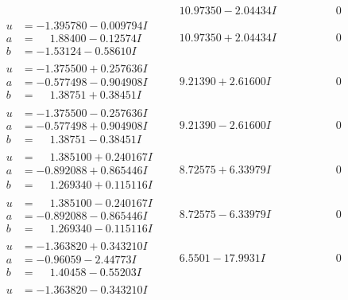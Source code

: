 \documentclass[1p]{elsarticle_modified}
\theoremstyle{definition}
\begin{document}
$$\begin{array}{c|c|c}
 & \phantom{-}10.97350 - 2.04434 I & \phantom{-0.000000 } 0 \\ \hline\begin{aligned}
u &= -1.395780 - 0.009794 I \\
a &= \phantom{-}1.88400 - 0.12574 I \\
b &= -1.53124 - 0.58610 I\end{aligned}
 & \phantom{-}10.97350 + 2.04434 I & \phantom{-0.000000 } 0 \\ \hline\begin{aligned}
u &= -1.375500 + 0.257636 I \\
a &= -0.577498 - 0.904908 I \\
b &= \phantom{-}1.38751 + 0.38451 I\end{aligned}
 & \phantom{-}9.21390 + 2.61600 I & \phantom{-0.000000 } 0 \\ \hline\begin{aligned}
u &= -1.375500 - 0.257636 I \\
a &= -0.577498 + 0.904908 I \\
b &= \phantom{-}1.38751 - 0.38451 I\end{aligned}
 & \phantom{-}9.21390 - 2.61600 I & \phantom{-0.000000 } 0 \\ \hline\begin{aligned}
u &= \phantom{-}1.385100 + 0.240167 I \\
a &= -0.892088 + 0.865446 I \\
b &= \phantom{-}1.269340 + 0.115116 I\end{aligned}
 & \phantom{-}8.72575 + 6.33979 I & \phantom{-0.000000 } 0 \\ \hline\begin{aligned}
u &= \phantom{-}1.385100 - 0.240167 I \\
a &= -0.892088 - 0.865446 I \\
b &= \phantom{-}1.269340 - 0.115116 I\end{aligned}
 & \phantom{-}8.72575 - 6.33979 I & \phantom{-0.000000 } 0 \\ \hline\begin{aligned}
u &= -1.363820 + 0.343210 I \\
a &= -0.96059 - 2.44773 I \\
b &= \phantom{-}1.40458 - 0.55203 I\end{aligned}
 & \phantom{-}6.5501 - 17.9931 I & \phantom{-0.000000 } 0 \\ \hline\begin{aligned}
u &= -1.363820 - 0.343210 I \\

\end{aligned}
\end{array}$$
\end{document}
